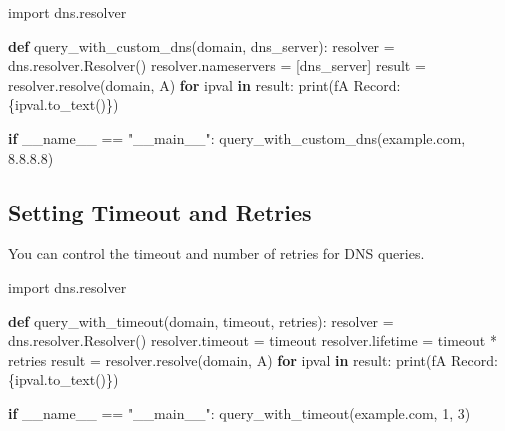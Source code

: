 \documentclass[
  letterpaper,
  DIV=11,
  numbers=noendperiod]{scrreprt}
\newenvironment{Shaded}{\begin{snugshade}}{\end{snugshade}}
\newcommand{\BuiltInTok}[1]{\textcolor[rgb]{0.00,0.23,0.31}{#1}}
\newcommand{\ControlFlowTok}[1]{\textcolor[rgb]{0.00,0.23,0.31}{\textbf{#1}}}
\newcommand{\DecValTok}[1]{\textcolor[rgb]{0.68,0.00,0.00}{#1}}
\newcommand{\ImportTok}[1]{\textcolor[rgb]{0.00,0.46,0.62}{#1}}
\newcommand{\KeywordTok}[1]{\textcolor[rgb]{0.00,0.23,0.31}{\textbf{#1}}}
\newcommand{\NormalTok}[1]{\textcolor[rgb]{0.00,0.23,0.31}{#1}}
\newcommand{\OperatorTok}[1]{\textcolor[rgb]{0.37,0.37,0.37}{#1}}
\newcommand{\SpecialCharTok}[1]{\textcolor[rgb]{0.37,0.37,0.37}{#1}}
\newcommand{\SpecialStringTok}[1]{\textcolor[rgb]{0.13,0.47,0.30}{#1}}
\newcommand{\StringTok}[1]{\textcolor[rgb]{0.13,0.47,0.30}{#1}}
\newcommand{\VariableTok}[1]{\textcolor[rgb]{0.07,0.07,0.07}{#1}}
\begin{document}
\begin{Shaded}
\begin{Highlighting}[]
\ImportTok{import}\NormalTok{ dns.resolver}

\KeywordTok{def}\NormalTok{ query\_with\_custom\_dns(domain, dns\_server):}
\NormalTok{    resolver }\OperatorTok{=}\NormalTok{ dns.resolver.Resolver()}
\NormalTok{    resolver.nameservers }\OperatorTok{=}\NormalTok{ [dns\_server]}
\NormalTok{    result }\OperatorTok{=}\NormalTok{ resolver.resolve(domain, }\StringTok{\textquotesingle{}A\textquotesingle{}}\NormalTok{)}
    \ControlFlowTok{for}\NormalTok{ ipval }\KeywordTok{in}\NormalTok{ result:}
        \BuiltInTok{print}\NormalTok{(}\SpecialStringTok{f\textquotesingle{}A Record: }\SpecialCharTok{\{}\NormalTok{ipval}\SpecialCharTok{.}\NormalTok{to\_text()}\SpecialCharTok{\}}\SpecialStringTok{\textquotesingle{}}\NormalTok{)}

\ControlFlowTok{if} \VariableTok{\_\_name\_\_} \OperatorTok{==} \StringTok{"\_\_main\_\_"}\NormalTok{:}
\NormalTok{    query\_with\_custom\_dns(}\StringTok{\textquotesingle{}example.com\textquotesingle{}}\NormalTok{, }\StringTok{\textquotesingle{}8.8.8.8\textquotesingle{}}\NormalTok{)}
\end{Highlighting}
\end{Shaded}

\subsection{Setting Timeout and
Retries}\label{setting-timeout-and-retries}

You can control the timeout and number of retries for DNS queries.

\begin{Shaded}
\begin{Highlighting}[]
\ImportTok{import}\NormalTok{ dns.resolver}

\KeywordTok{def}\NormalTok{ query\_with\_timeout(domain, timeout, retries):}
\NormalTok{    resolver }\OperatorTok{=}\NormalTok{ dns.resolver.Resolver()}
\NormalTok{    resolver.timeout }\OperatorTok{=}\NormalTok{ timeout}
\NormalTok{    resolver.lifetime }\OperatorTok{=}\NormalTok{ timeout }\OperatorTok{*}\NormalTok{ retries}
\NormalTok{    result }\OperatorTok{=}\NormalTok{ resolver.resolve(domain, }\StringTok{\textquotesingle{}A\textquotesingle{}}\NormalTok{)}
    \ControlFlowTok{for}\NormalTok{ ipval }\KeywordTok{in}\NormalTok{ result:}
        \BuiltInTok{print}\NormalTok{(}\SpecialStringTok{f\textquotesingle{}A Record: }\SpecialCharTok{\{}\NormalTok{ipval}\SpecialCharTok{.}\NormalTok{to\_text()}\SpecialCharTok{\}}\SpecialStringTok{\textquotesingle{}}\NormalTok{)}

\ControlFlowTok{if} \VariableTok{\_\_name\_\_} \OperatorTok{==} \StringTok{"\_\_main\_\_"}\NormalTok{:}
\NormalTok{    query\_with\_timeout(}\StringTok{\textquotesingle{}example.com\textquotesingle{}}\NormalTok{, }\DecValTok{1}\NormalTok{, }\DecValTok{3}\NormalTok{)}
\end{Highlighting}
\end{Shaded}
\end{document}
